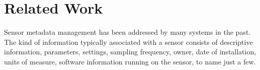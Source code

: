 \section{Related Work}



Sensor metadata management has been addressed by many systems in the past.  The kind of information typically
associated with a sensor consists of descriptive information, parameters, settings, sampling frequency,
owner, date of installation, units of measure, software information running on the sensor, to name just a few.

